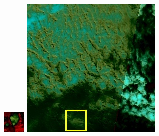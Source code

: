 \documentclass[10pt]{ctexart}
\begin{document}
\begin{multicols}{2}
\begin{figure}[H]
{\begin{minipage}[b]{0.15\linewidth}
            \includegraphics[width=1\linewidth]{../log/spoon2/cut2/tmp_cut_LC80460282014171LGN00_12434_spectral.jpg}\vspace{4pt}
            \includegraphics[width=1\linewidth]{../log/spoon2/cut2/LC81620432014072LGN00_16237_spectral.jpg}\vspace{4pt}

\end{minipage}}
\end{figure}
\end{multicols}
\end{document}
